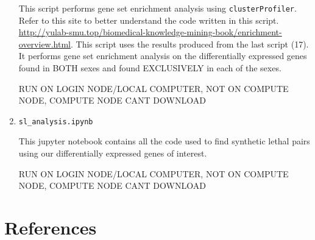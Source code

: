 \documentclass[10pt]{article}
\begin{document}
\begin{enumerate}
This script performs gene set enrichment analysis using \texttt{clusterProfiler}. Refer to this site to better understand the code written in this script.
\url{http://yulab-smu.top/biomedical-knowledge-mining-book/enrichment-overview.html}. This script uses the results produced from the last script (17). It performs gene set enrichment analysis on the differentially expressed genes found in BOTH sexes and found EXCLUSIVELY in each of the sexes.

RUN ON LOGIN NODE/LOCAL COMPUTER, NOT ON COMPUTE NODE, COMPUTE NODE CANT DOWNLOAD

\item\texttt{sl\_analysis.ipynb}

This jupyter notebook contains all the code used to find synthetic lethal pairs using our differentially expressed genes of interest.

RUN ON LOGIN NODE/LOCAL COMPUTER, NOT ON COMPUTE NODE, COMPUTE NODE CANT DOWNLOAD
	
\end{enumerate}

\clearpage\newpage
\section{References}


\nocite{*}
\printbibliography[heading=none, sorting=nyt]
\newpage

%

%

%
\end{document}
